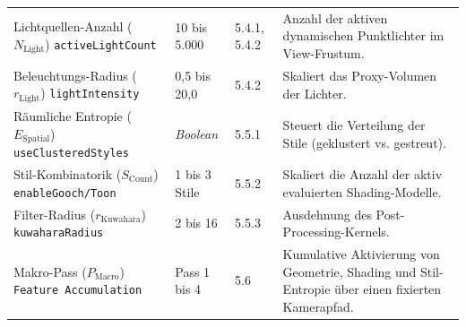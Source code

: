 \begin{longtable}{@{} >{\raggedright\arraybackslash}p{} p{} p{} >{\raggedright\arraybackslash}p{} @{}}
    Lichtquellen-Anzahl ($N_{\text{Light}}$) \newline \scriptsize{\texttt{activeLightCount}} & 10 bis 5.000 & 5.4.1,
    5.4.2 & Anzahl der aktiven dynamischen Punktlichter im View-Frustum. \\

    Beleuchtungs-Radius ($r_{\text{Light}}$) \newline \scriptsize{\texttt{lightIntensity}} & 0,5 bis 20,0 & 5.4.2 &
    Skaliert das Proxy-Volumen der Lichter. \\

    Räumliche Entropie ($E_{\text{Spatial}}$) \newline \scriptsize{\texttt{useClusteredStyles}} & \textit{Boolean} &
    5.5.1 & Steuert die Verteilung der Stile (geklustert vs. gestreut). \\

    Stil-Kombinatorik ($S_{\text{Count}}$) \newline \scriptsize{\texttt{enableGooch/Toon}} & 1 bis 3 Stile & 5.5.2 &
    Skaliert die Anzahl der aktiv evaluierten Shading-Modelle. \\

    Filter-Radius ($r_{\text{Kuwahara}}$) \newline \scriptsize{\texttt{kuwaharaRadius}} & 2 bis 16 & 5.5.3 & Ausdehnung
    des Post-Processing-Kernels. \\

    Makro-Pass ($P_{\text{Macro}}$) \newline \scriptsize{\texttt{Feature Accumulation}} & Pass 1 bis 4 & 5.6 &
    Kumulative Aktivierung von Geometrie, Shading und Stil-Entropie über einen fixierten Kamerapfad. \\
\end{longtable}

